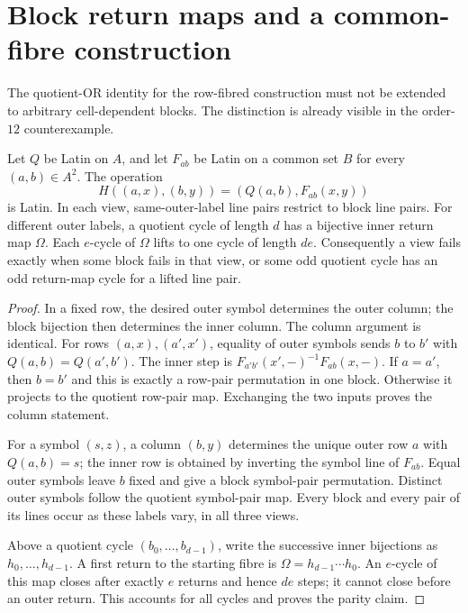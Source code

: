 \section{Block return maps and a common-fibre construction}
\label{sec:block-crt}

The quotient-OR identity for the row-fibred construction must not be
extended to arbitrary cell-dependent blocks. The distinction is already
visible in the order-$12$ counterexample.

\begin{theorem}
\label{thm:block-return}
Let $Q$ be Latin on $A$, and let $F_{ab}$ be Latin on a common set $B$
for every $(a,b)\in A^2$. The operation
\[
 H((a,x),(b,y))=(Q(a,b),F_{ab}(x,y))
\]
is Latin. In each view, same-outer-label line pairs restrict to block
line pairs. For different outer labels, a quotient cycle of length $d$
has a bijective inner return map $\Omega$. Each $e$-cycle of $\Omega$
lifts to one cycle of length $de$. Consequently a view fails exactly
when some block fails in that view, or some odd quotient cycle has an
odd return-map cycle for a lifted line pair.
\end{theorem}

\begin{proof}
In a fixed row, the desired outer symbol determines the outer column;
the block bijection then determines the inner column. The column argument
is identical. For rows $(a,x),(a',x')$, equality of outer symbols sends
$b$ to $b'$ with $Q(a,b)=Q(a',b')$. The inner step is
$F_{a'b'}(x',-)^{-1}F_{ab}(x,-)$. If $a=a'$, then $b=b'$ and this
is exactly a row-pair permutation in one block. Otherwise it projects
to the quotient row-pair map. Exchanging the two inputs proves the
column statement.

For a symbol $(s,z)$, a column $(b,y)$ determines the unique outer row
$a$ with $Q(a,b)=s$; the inner row is obtained by inverting the symbol
line of $F_{ab}$. Equal outer symbols leave $b$ fixed and give a block
symbol-pair permutation. Distinct outer symbols follow the quotient
symbol-pair map. Every block and every pair of its lines occur as these
labels vary, in all three views.

Above a quotient cycle $(b_0,\ldots,b_{d-1})$, write the successive inner
bijections as $h_0,\ldots,h_{d-1}$. A first return to the starting fibre
is $\Omega=h_{d-1}\cdots h_0$. An $e$-cycle of this map closes after
exactly $e$ returns and hence $de$ steps; it cannot close before an
outer return. This accounts for all cycles and proves the parity claim.
\end{proof}

